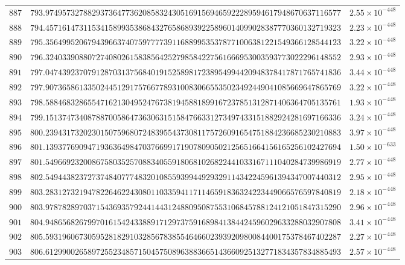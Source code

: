 \documentclass[12pt,reqno]{amsart}
\theoremstyle{remark}
\begin{document}
\begin{longtable}{clc}
$887$ & $793.9749573278829373647736208583243051691569465922289594617948670637116577$ & $2.55\times 10^{-448}$ \\
$888$ & $794.4571614731153415899353868432765868939225896014099028387770360132719323$ & $2.23\times 10^{-448}$ \\
$889$ & $795.3564995206794396637407597777391168899535378771006381221549366128544123$ & $3.22\times 10^{-448}$ \\
$890$ & $796.3240339088072740802615838564252798584227561666953003593773022296148552$ & $2.93\times 10^{-448}$ \\
$891$ & $797.0474392370791287031375684019152589817238954994420948378417871765741836$ & $3.44\times 10^{-448}$ \\
$892$ & $797.9073658613350244512917576677893100830665535023492449041085669647865769$ & $3.22\times 10^{-448}$ \\
$893$ & $798.5884683286554716213049524767381945881899167237851312871406364705135761$ & $1.93\times 10^{-448}$ \\
$894$ & $799.1513747340878870058647363063151584766331273497433151882924281697166336$ & $3.24\times 10^{-448}$ \\
$895$ & $800.2394317320230150759680724839554373081175726091654751884236685230210883$ & $3.97\times 10^{-448}$ \\
$896$ & $801.1393776909471936364984703766991719078090502125651664156165256102427694$ & $1.50\times 10^{-633}$ \\
$897$ & $801.5496692320086758035257088340559180681026822441033167111040284739986919$ & $2.77\times 10^{-448}$ \\
$898$ & $802.5494438237273748407774832010855939944929329114342245961394347007440312$ & $2.95\times 10^{-448}$ \\
$899$ & $803.2831273219478226462243080110335941171146591836324223449066576597840819$ & $2.18\times 10^{-448}$ \\
$900$ & $803.9787828970371543693579244144312488095087553106845788124121051847315290$ & $2.96\times 10^{-448}$ \\
$901$ & $804.9486568267997016154243388917129737591689841384424596029633288032907808$ & $3.41\times 10^{-448}$ \\
$902$ & $805.5931960673059528182910328567838554646602393920980084400175378467402287$ & $2.27\times 10^{-448}$ \\
$903$ & $806.6129900265897255234857150457508963883665143660925132771834357834885493$ & $2.57\times 10^{-448}$ \\

\end{longtable}
\end{document}
